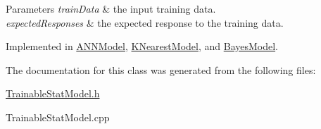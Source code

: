 \begin{DoxyParams}{Parameters}
{\em train\-Data} & the input training data. \\
\hline
{\em expected\-Responses} & the expected response to the training data. \\
\hline
\end{DoxyParams}


Implemented in \hyperlink{class_a_n_n_model_a2da3c5c659871364f9bcead4980b70f1}{A\-N\-N\-Model}, \hyperlink{class_k_nearest_model_ae5278bb119540c9263bc96ad0eeea469}{K\-Nearest\-Model}, and \hyperlink{class_bayes_model_a72af01b372a06ebac227e0bb4fd4a7de}{Bayes\-Model}.



The documentation for this class was generated from the following files\-:\begin{DoxyCompactItemize}
\item 
\hyperlink{_trainable_stat_model_8h}{Trainable\-Stat\-Model.\-h}\item 
Trainable\-Stat\-Model.\-cpp\end{DoxyCompactItemize}
